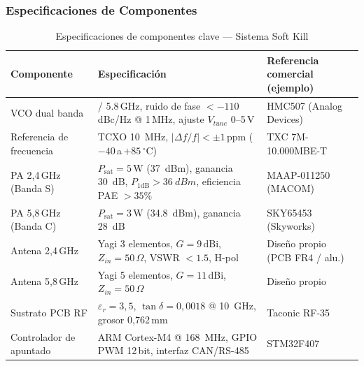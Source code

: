 \documentclass[12pt,a4paper]{article}
\begin{document}
\subsubsection{Especificaciones de Componentes}

\begin{table}[H]
\centering
\caption{Especificaciones de componentes clave — Sistema Soft Kill}
\label{tab:comp_sk}
\renewcommand{\arraystretch}{1.25}
\begin{tabularx}{\textwidth}{>{\hsize=0.8\hsize\raggedright\arraybackslash}X >{\raggedright\arraybackslash}X >{\raggedright\arraybackslash}X}
\toprule
\textbf{Componente} & \textbf{Especificación} & \textbf{Referencia comercial (ejemplo)} \\
\midrule
VCO dual banda &
  2.4 / 5.8\,GHz, ruido de fase $< -110$\,dBc/Hz @ 1\,MHz,
  ajuste $V_{tune}$ 0–5\,V &
  HMC507 (Analog Devices) \\[2pt]

Referencia de frecuencia &
  TCXO \SI{10}{MHz}, $|\Delta f/f| < \pm 1$\,ppm ($-40$\,a\,$+85\,^{\circ}$C) &
  TXC 7M-10.000MBE-T \\[2pt]

PA 2,4\,GHz (Banda S) &
  $P_\mathrm{sat} = 5$\,W (\SI{37}{dBm}), ganancia \SI{30}{dB},
  $P_{1\mathrm{dB}} > \SI{36}{dBm}$, eficiencia PAE $> 35\%$ &
  MAAP-011250 (MACOM) \\[2pt]

PA 5,8\,GHz (Banda C) &
  $P_\mathrm{sat} = 3$\,W (\SI{34.8}{dBm}), ganancia \SI{28}{dB} &
  SKY65453 (Skyworks) \\[2pt]

Antena 2,4\,GHz &
  Yagi 3 elementos, $G = 9$\,dBi, $Z_{in} = 50\,\Omega$,
  VSWR $< 1.5$, H-pol &
  Diseño propio (PCB FR4 / alu.) \\[2pt]

Antena 5,8\,GHz &
  Yagi 5 elementos, $G = 11$\,dBi, $Z_{in} = 50\,\Omega$ &
  Diseño propio \\[2pt]

Sustrato PCB RF &
  $\varepsilon_r = 3{,}5$, $\tan\delta = 0{,}0018$ @ \SI{10}{GHz},
  grosor 0,762\,mm &
  Taconic RF-35 \\[2pt]

Controlador de apuntado &
  ARM Cortex-M4 @ \SI{168}{MHz}, GPIO PWM 12\,bit,
  interfaz CAN/RS-485 &
  STM32F407 \\
\bottomrule
\end{tabularx}
\end{table}
\end{document}
